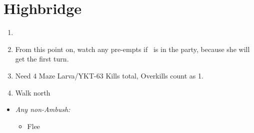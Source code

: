 \chapter{Highbridge}
\begin{spheregrid}
    \begin{itemize}
        \yunaf
    \end{itemize}
\end{spheregrid}
\begin{enumerate}
    \item \formation{\tidus}{\yuna}{\wakka}
    \item From this point on, watch any pre-empts if \yuna\ is in the party, because she will get the first turn.
    \item Need 4 Maze Larva/YKT-63 Kills total, Overkills count as 1.
    \item Walk north
\end{enumerate}
\begin{encounters}
    \begin{itemize}
        \item \textit{Any non-Ambush:}
        \begin{itemize}
            \tidusf Attack YKT-63
            \yunaf Attack the same YKT-63
            \item Flee
        \end{itemize}
    \end{itemize}
\end{encounters}
